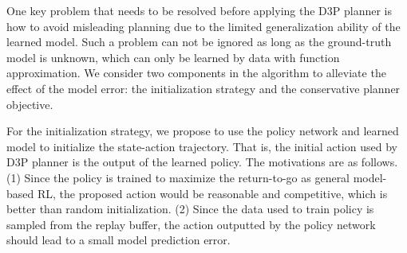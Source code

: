\documentclass{article} %
\newcommand{\yue}[1]{ {#1}}
\begin{document}



One key problem that needs to be resolved before applying the D3P planner is how to avoid  misleading planning due to the limited generalization ability of the learned model. Such a problem can not be ignored  as long as the ground-truth model is unknown, which can only be learned by data with function approximation. We consider two components in the algorithm to alleviate the effect of the model error: the initialization strategy and the conservative planner objective.  


For the initialization strategy,  we propose to use the policy network and learned model to initialize the state-action trajectory. 
\yue{That is, the initial action used by  D3P planner is the output of the learned policy. The motivations are as follows. (1) Since the policy is trained to maximize the return-to-go as general model-based RL, the proposed action would be reasonable and competitive, which is better than random initialization. (2) Since the data used to train policy is sampled from the replay buffer, the action outputted by the policy network should lead to a small model prediction error.}
\end{document}
